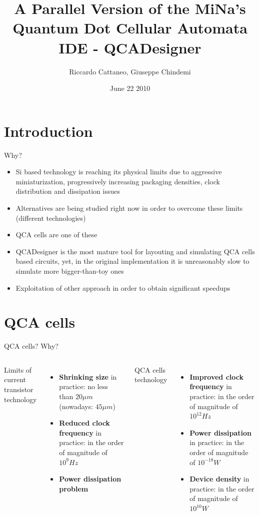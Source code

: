 \documentclass[10pt, red]{beamer}
\title[CUDAQCADesigner]{A Parallel Version of the MiNa's Quantum Dot Cellular Automata IDE - QCADesigner}
\author{Riccardo Cattaneo, Giuseppe Chindemi}
\institute{
  Politecnico di Milano\\
  HPPS
}
\date{June 22 2010}
\begin{document}
\begin{frame}
  \titlepage
\end{frame}

\section{Introduction}
	\begin{frame}{Why?}
		\begin{itemize} 
			\item Si based technology is reaching its physical limits due to aggressive miniaturization, progressively increasing packaging densities, clock distribution and dissipation issues
			\item Alternatives are being studied right now in order to overcome these limits (different technologies)
			\item QCA cells are one of these
			\item QCADesigner is the most mature tool for layouting and simulating QCA cells based circuits, yet, in the original implementation it is unreasonably slow to simulate more bigger-than-toy ones
			\item Exploitation of other approach in order to obtain significant speedups
		\end{itemize}
	\end{frame}

\section{QCA cells}
	\begin{frame}{QCA cells? Why?}
		\begin{columns}
		\centering
	
			Limits of current transistor technology 
		 	\begin{itemize}
			 	\item	\textbf{Shrinking size} in practice: no less than $  20 \mu m $ (nowadays: $45\mu m$)
			 	\item \textbf{Reduced clock frequency} in practice: in the order of magnitude of $10^9 Hz$
			 	\item \textbf{Power dissipation problem}
		 	\end{itemize}
			 	
			QCA cells technology
		 	\begin{itemize}
			 	\item \textbf{Improved clock frequency} in practice: in the order of magnitude of $10^{12} Hz$
			 	\item \textbf{Power dissipation} in practice: in the order of magnitude of $10^{-18} W$
			 	\item \textbf{Device density} in practice: in the order of magnitude of $10^{10} W$
		 	\end{itemize}
		\end{columns}
	\end{frame}
\end{document}
